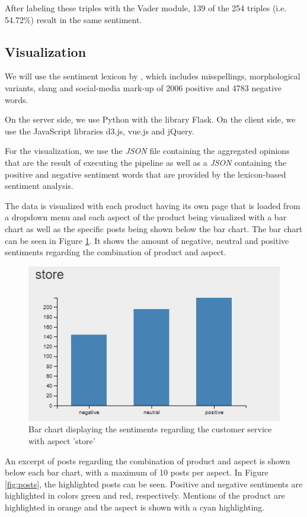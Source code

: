 \documentclass[10pt,a4paper]{article}
\begin{document}
	After labeling these triples with the Vader module, 139 of the 254 triples (i.e. 54.72\%) result in the same sentiment.

		\subsection{Visualization}
		We will use the sentiment lexicon by \cite{Hu:2004:MSC:1014052.1014073}, which includes misspellings, morphological variants, slang and social-media mark-up of 2006 positive and 4783 negative words.

		On the server side, we use Python with the library Flask. On the client side, we use the JavaScript libraries d3.js, vue.js and jQuery.
	
		For the visualization, we use the \textit{JSON} file containing the aggregated opinions that are the result of executing the pipeline as well as a \textit{JSON} containing the positive and negative sentiment words that are provided by the lexicon-based sentiment analysis.
	
		The data is visualized with each product having its own page that is loaded from a dropdown menu and each aspect of the product being visualized with a bar chart as well as the specific posts being shown below the bar chart. The bar chart can be seen in Figure \ref{fig:barchart}. It shows the amount of negative, neutral and positive sentiments regarding the combination of product and aspect.
	
		\begin{figure}[h]
			\centering
			\includegraphics[width=0.7\linewidth]{data/barchart}
			\caption{Bar chart displaying the sentiments regarding the customer service with aspect 'store'}
			\label{fig:barchart}
		\end{figure}
			
	An excerpt of posts regarding the combination of product and aspect is shown below each bar chart, with a maximum of 10 posts per aspect. In Figure \ref{fig:posts}, the highlighted posts can be seen. Positive and negative sentiments are highlighted in colors green and red, respectively. Mentions of the product are highlighted in orange and the aspect is shown with a cyan highlighting.	
			
\end{document}
